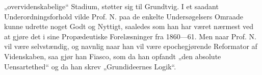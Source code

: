 \documentclass[12pt,a4paper]{book}
\begin{document}
„overvidenskabelige“ Stadium, støtter sig til Grundtvig. I et saadant
Underordningsforhold vilde Prof. N. paa de enkelte Undersøgelsers Omraade kunne
udrette noget Godt og Nyttigt, saaledes som han har været nærmest ved at gjøre
det i sine Propædeutiske Forelæsninger fra 1860---61. Men naar Prof. N. vil være
selvstændig, og navnlig naar han vil være epochegjørende Reformator af
Videnskaben, saa gjør han Fiasco, som da han opfandt „den absolute
Uensartethed“ og da han skrev „Grundideernes Logik“.
\end{document}

